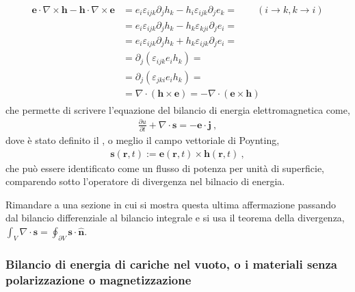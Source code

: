 \documentclass[letterpaper,10pt,english]{jupyterBook}
\begin{document}
\begin{equation*}
\begin{split}\begin{aligned}
\mathbf{e} \cdot \nabla \times \mathbf{h} - \mathbf{h} \cdot \nabla \times \mathbf{e} & = e_i \varepsilon_{ijk} \partial_j h_k - h_i \varepsilon_{ijk} \partial_j e_k = \qquad (i \rightarrow k, k \rightarrow i)\\
& = e_i \varepsilon_{ijk} \partial_j h_k - h_k \varepsilon_{kji} \partial_j e_i = \\
& = e_i \varepsilon_{ijk} \partial_j h_k + h_k \varepsilon_{ijk} \partial_j e_i = \\
& =  \partial_j (\varepsilon_{ijk} e_i  h_k ) = \\
& =  \partial_j (\varepsilon_{jki} e_i  h_k ) = \\
& = \nabla \cdot (\mathbf{h} \times \mathbf{e}) = - \nabla \cdot (\mathbf{e} \times \mathbf{h})
\end{aligned}\end{split}
\end{equation*}
\sphinxAtStartPar
che permette di scrivere l’equazione del bilancio di energia elettromagnetica come,
\begin{equation*}
\begin{split}\frac{\partial u }{\partial t} + \nabla \cdot \mathbf{s} = - \mathbf{e} \cdot \mathbf{j} \ ,\end{split}
\end{equation*}
\sphinxAtStartPar
dove è stato definito il , o meglio il campo vettoriale di Poynting,
\begin{equation*}
\begin{split}\mathbf{s}(\mathbf{r},t) := \mathbf{e}(\mathbf{r},t) \times \mathbf{h}(\mathbf{r},t) \ ,\end{split}
\end{equation*}
\sphinxAtStartPar
che può essere identificato come un flusso di potenza per unità di superficie, comparendo sotto l’operatore di divergenza nel bilnacio di energia.

\sphinxAtStartPar
{} Rimandare a una sezione in cui si mostra questa ultima affermazione passando dal bilancio differenziale al bilancio integrale e si usa il teorema della divergenza, \(\int_V \nabla \cdot \mathbf{s} = \oint_{\partial V} \mathbf{s} \cdot \hat{\mathbf{n}}\).
\subsubsection*{Bilancio di energia di cariche nel vuoto, o i materiali senza polarizzazione o magnetizzazione}
\end{document}
